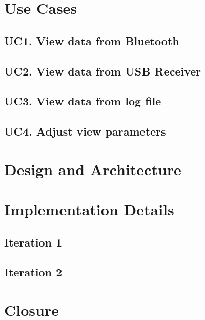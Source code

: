 
	\section{Use Cases}

		\subsection{UC1. View data from Bluetooth}
		\subsection{UC2. View data from USB Receiver}
		\subsection{UC3. View data from log file}
		\subsection{UC4. Adjust view parameters}

	\section{Design and Architecture}

	\section{Implementation Details}
		\subsection{Iteration 1}
			
		\subsection{Iteration 2}

	\section{Closure}

